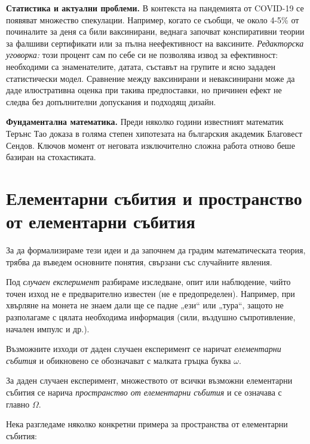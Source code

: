 \textbf{Статистика и актуални проблеми.} В контекста на пандемията от COVID-19 се появяват множество спекулации. Например, когато се съобщи, че около 4-5\% от починалите за деня са били ваксинирани, веднага започват конспиративни теории за фалшиви сертификати или за пълна неефективност на ваксините. \emph{Редакторска уговорка:} този процент сам по себе си не позволява извод за ефективност: необходими са знаменателите, датата, съставът на групите и ясно зададен статистически модел. Сравнение между ваксинирани и неваксинирани може да даде илюстративна оценка при такива предпоставки, но причинен ефект не следва без допълнителни допускания и подходящ дизайн.


\textbf{Фундаментална математика.} Преди няколко години известният математик Терънс Тао доказа в голяма степен хипотезата на българския академик Благовест Сендов. Ключов момент от неговата изключително сложна работа отново беше базиран на стохастиката.


\section{Елементарни събития и пространство от елементарни събития}

За да формализираме тези идеи и да започнем да градим математическата теория, трябва да въведем основните понятия, свързани със случайните явления.

\begin{defn}
Под \emph{случаен експеримент} разбираме изследване, опит или наблюдение, чийто точен изход не е предварително известен (не е предопределен). Например, при хвърляне на монета не знаем дали ще се падне „ези“ или „тура“, защото не разполагаме с цялата необходима информация (сили, въздушно съпротивление, начален импулс и др.).
\end{defn}

\begin{defn}
Възможните изходи от даден случаен експеримент се наричат \emph{елементарни събития} и обикновено се обозначават с малката гръцка буква $\omega$.
\end{defn}

\begin{defn}
За даден случаен експеримент, множеството от всички възможни елементарни събития се нарича \emph{пространство от елементарни събития} и се означава с главно $\Omega$.
\end{defn}

Нека разгледаме няколко конкретни примера за пространства от елементарни събития:

